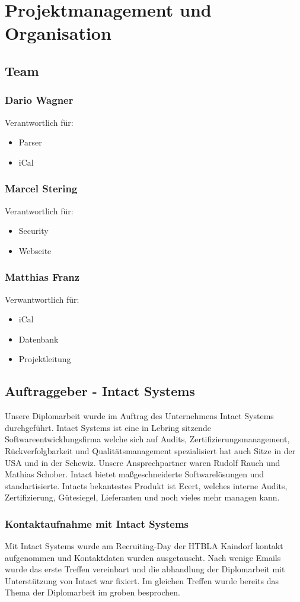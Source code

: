 \section{Projektmanagement und Organisation}
\label{sec:ProjUOrg}

\subsection{Team} %
	\subsubsection*{Dario Wagner}
		Verantwortlich für: 
		\begin{itemize}
			\item Parser
			\item iCal
		\end{itemize}
	\subsubsection*{Marcel Stering}
		Verantwortlich für: 
		\begin{itemize}
			\item Security
			\item Webseite
		\end{itemize}
	\subsubsection*{Matthias Franz}
		Verwantwortlich für: 
		\begin{itemize}
			\item iCal
			\item Datenbank
			\item Projektleitung
		\end{itemize}				

\subsection{Auftraggeber - Intact Systems}
Unsere Diplomarbeit wurde im Auftrag des Unternehmens Intact Systems durchgeführt. Intact Systems ist eine in Lebring sitzende Softwareentwicklungsfirma welche sich auf Audits, Zertifizierungsmanagement, Rückverfolgbarkeit und Qualitätsmanagement spezialisiert hat auch Sitze in der USA und in der Schewiz. Unsere Ansprechpartner waren Rudolf Rauch und Mathias Schober. Intact bietet maßgeschneiderte Softwarelösungen und standartisierte. Intacts bekantestes Produkt ist Ecert, welches interne Audits, Zertifizierung, Gütesiegel, Lieferanten und noch vieles mehr managen kann.
	\subsubsection*{Kontaktaufnahme mit Intact Systems}
	Mit Intact Systems wurde am Recruiting-Day der HTBLA Kaindorf kontakt aufgenommen und Kontaktdaten wurden ausgetauscht. Nach wenige Emails wurde das erste Treffen vereinbart und die abhandlung der Diplomarbeit mit Unterstützung von Intact war fixiert. Im gleichen Treffen wurde bereits das Thema der Diplomarbeit im groben besprochen.  